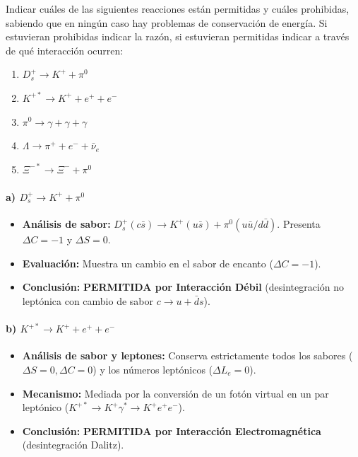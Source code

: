 \begin{problema}
Indicar cuáles de las siguientes reacciones están permitidas y cuáles prohibidas, sabiendo que en ningún caso hay problemas de conservación de energía. Si estuvieran prohibidas indicar la razón, si estuvieran permitidas indicar a través de qué interacción ocurren:

\begin{enumerate}[label=\alph*.]
    \item $D_s^+ \longrightarrow K^+ + \pi^0$
    \item $K^{+*} \longrightarrow K^+ + e^+ + e^-$
    \item $\pi^0 \longrightarrow \gamma + \gamma + \gamma$
    \item $\Lambda \longrightarrow \pi^+ + e^- + \bar{\nu}_e$
    \item $\Xi^{-*} \longrightarrow \Xi^- + \pi^0$
\end{enumerate}

\tcblower

\paragraph{a) $D_s^+ \longrightarrow K^+ + \pi^0$}
\begin{itemize}
    \item \textbf{Análisis de sabor:} $D_s^+(c\bar{s}) \to K^+(u\bar{s}) + \pi^0(u\bar{u}/d\bar{d})$. Presenta $\Delta C = -1$ y $\Delta S = 0$.
    \item \textbf{Evaluación:} Muestra un cambio en el sabor de encanto ($\Delta C = -1$).
    \item \textbf{Conclusión:} \textbf{PERMITIDA por Interacción Débil} (desintegración no leptónica con cambio de sabor $c \to u + \bar{d}s$).
\end{itemize}

\paragraph{b) $K^{+*} \longrightarrow K^+ + e^+ + e^-$}
\begin{itemize}
    \item \textbf{Análisis de sabor y leptones:} Conserva estrictamente todos los sabores ($\Delta S = 0, \Delta C = 0$) y los números leptónicos ($\Delta L_e = 0$).
    \item \textbf{Mecanismo:} Mediada por la conversión de un fotón virtual en un par leptónico ($K^{+*} \to K^+ \gamma^* \to K^+ e^+ e^-$).
    \item \textbf{Conclusión:} \textbf{PERMITIDA por Interacción Electromagnética} (desintegración Dalitz).
\end{itemize}


\end{problema}
